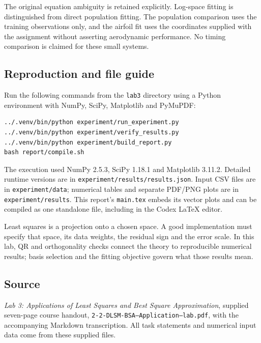 \documentclass[11pt,a4paper]{article}
\begin{document}
The original equation ambiguity is retained explicitly. Log-space fitting is distinguished from direct population fitting. The population comparison uses the training observations only, and the airfoil fit uses the coordinates supplied with the assignment without asserting aerodynamic performance. No timing comparison is claimed for these small systems.

\subsection{Reproduction and file guide}
Run the following commands from the \texttt{lab3} directory using a Python environment with NumPy, SciPy, Matplotlib and PyMuPDF:
\begin{verbatim}
../.venv/bin/python experiment/run_experiment.py
../.venv/bin/python experiment/verify_results.py
../.venv/bin/python experiment/build_report.py
bash report/compile.sh
\end{verbatim}
The execution used NumPy 2.5.3, SciPy 1.18.1 and Matplotlib 3.11.2. Detailed runtime versions are in \texttt{experiment/results/results.json}. Input CSV files are in \texttt{experiment/data}; numerical tables and separate PDF/PNG plots are in \texttt{experiment/results}. This report's \texttt{main.tex} embeds its vector plots and can be compiled as one standalone file, including in the Codex LaTeX editor.

Least squares is a projection onto a chosen space. A good implementation must specify that space, its data weights, the residual sign and the error scale. In this lab, QR and orthogonality checks connect the theory to reproducible numerical results; basis selection and the fitting objective govern what those results mean.

\subsection*{Source}
\textit{Lab 3: Applications of Least Squares and Best Square Approximation}, supplied seven-page course handout, \texttt{2-2-DLSM-BSA--Application--lab.pdf}, with the accompanying Markdown transcription. All task statements and numerical input data come from these supplied files.
\end{document}
